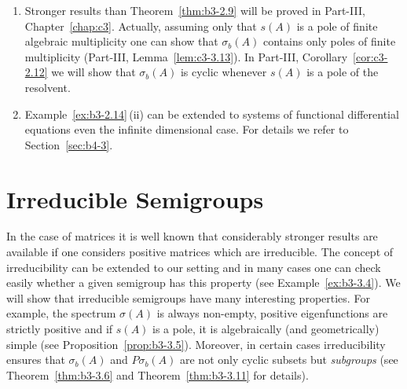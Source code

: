 \begin{remarks}
\begin{enumerate}[\upshape (i), wide, labelindent=.25em]
	\item 
	Stronger results than Theorem~\ref{thm:b3-2.9} will be proved in Part-III, Chapter~\ref{chap:c3}.
	Actually, assuming only that $s(A)$ is a pole of finite algebraic multiplicity one can show that $\sigma_{b}(A)$ contains only poles of finite multiplicity (Part-III, Lemma~\ref{lem:c3-3.13}).
	In Part-III, Corollary~\ref{cor:c3-2.12} we will show that $\sigma_{b}(A)$ is cyclic whenever $s(A)$ is a pole of the resolvent.
	
	\item 
	Example~\ref{ex:b3-2.14}\,(ii) can be extended to systems of functional differential equations even the infinite dimensional case.
	For details we refer to Section~\ref{sec:b4-3}.
\end{enumerate}	
\end{remarks}

\section{Irreducible Semigroups}\label{sec:b3-3}%
In the case of matrices it is well known that considerably stronger results are available if one considers positive matrices which are irreducible. 
The concept of irreducibility can be extended to our setting and in many cases one can check easily whether a given semigroup has this property (see Example~\ref{ex:b3-3.4}). 
We will show that irreducible semigroups have many interesting properties. 
For example, the spectrum $\sigma(A)$ is always non-empty, positive eigenfunctions are strictly positive and if\/ $s(A)$ is a pole, it is algebraically (and geometri­cally) simple (see Proposition~\ref{prop:b3-3.5}). 
Moreover, in certain cases irreducibility ensures that $\sigma_{b}(A)$ and $P\sigma_{b}(A)$ are not only cyclic subsets but \emph{subgroups} (see Theorem~\ref{thm:b3-3.6} and Theorem~\ref{thm:b3-3.11} for details). 

